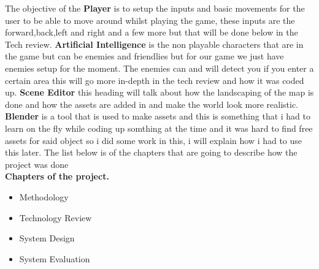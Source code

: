 The objective of the \textbf{Player} is to setup the inputs and basic movements for the user to be able to move around whilst playing the game, these inputs are the forward,back,left and right and a few more but that will be done below in the Tech review.
\newline
\newline
\textbf{Artificial Intelligence} is the non playable characters that are in the game but can be enemies and friendlies but for our game we just have enemies setup for the moment. The enemies can and will detect you if you enter a certain area this will go more in-depth in the tech review and how it was coded up.
\newline
\newline
\textbf{Scene Editor} this heading will talk about how the landscaping of the map is done and how the assets are added in and make the world look more realistic.
\newline\newline
\textbf{Blender} is a tool that is used to make assets and this is something that i had to learn on the fly while coding up somthing at the time and it was hard to find free assets for said object so i did some work in this, i will explain how i had to use this later.
\newline\newline
The list below is of the chapters that are going to describe how the project was done \\[0.2cm] \textbf{Chapters of the project.}
\begin{itemize}
    \item Methodology
    \item Technology Review
    \item System Design
    \item System Evaluation
\end{itemize}

